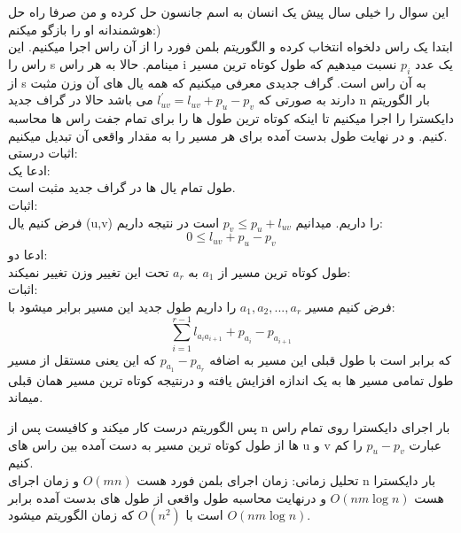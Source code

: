 \problem{}
این سوال را خیلی سال پیش یک انسان به اسم جانسون حل کرده
و من صرفا راه حل هوشمندانه او را بازگو میکنم:)\\
ابتدا یک راس دلخواه انتخاب کرده و الگوریتم بلمن فورد را از آن راس اجرا میکنیم.
این راس را s مینامم.
حالا به هر راس i یک عدد $p_i$ نسبت میدهیم که
طول کوتاه ترین مسیر از s به آن راس است.
گراف جدیدی معرفی میکنیم که همه یال های آن وزن مثبت دارند
به صورتی که $l^{\prime}_{uv} = l_{uv}+p_u - p_v$ می باشد
حالا در گراف جدید n بار الگوریتم دایکسترا را اجرا میکنیم
تا اینکه کوتاه ترین طول ها را برای تمام جفت راس ها محاسبه کنیم.
و در نهایت طول بدست آمده برای هر مسیر را به مقدار واقعی آن تبدیل میکنیم.\\
اثبات درستی:\\
ادعا یک:\\
طول تمام یال ها در گراف جدید مثبت است.\\
اثبات:\\
فرض کنیم یال (u,v) را داریم.
میدانیم $p_v\leq p_u+l_{uv}$ است در نتیجه 
داریم:\\
\[ 0\leq l_{uv}+p_u- p_v\]
ادعا دو:\\
طول کوتاه ترین مسیر از $a_1$ به $a_r$ تحت این تغییر وزن تغییر نمیکند:\\
اثبات:\\
فرض کنیم مسیر $a_1,a_2,...,a_r$ را داریم
طول جدید این مسیر برابر میشود با:\\
\[
    \sum_{i = 1}^{r-1}{l_{a_i a_{i+1}} + p_{a_i}-p_{a_{i+1}}}
\]
که برابر است با طول قبلی این مسیر به اضافه $p_{a_1}-p_{a_r}$
که این یعنی مستقل از مسیر طول تمامی مسیر ها به یک اندازه افزایش یافته
و درنتیجه کوتاه ترین مسیر همان قبلی میماند.
 
پس الگوریتم درست کار میکند و کافیست پس از n بار اجرای دایکسترا روی تمام راس ها
از طول کوتاه ترین مسیر به دست آمده بین راس های u و v عبارت 
$p_{u}-p_{v}$ را کم کنیم.
\\تحلیل زمانی:
زمان اجرای بلمن فورد هست $O(mn)$ و زمان اجرای n بار دایکسترا هست
$O(nm\log{n})$ و درنهایت محاسبه طول واقعی از طول های بدست آمده برابر است با $O(n^2)$ که زمان الگوریتم میشود
$O(nm\log{n})$.